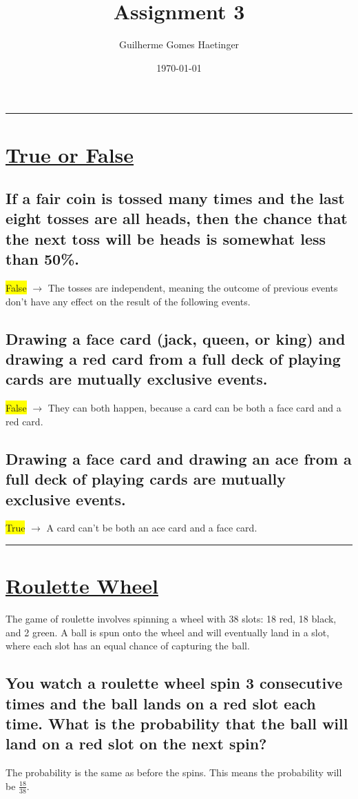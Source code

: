 \documentclass[11pt]{article}
\author{Guilherme Gomes Haetinger}
\date{\today}
\title{\huge Assignment 3}
\begin{document}
\maketitle
\thispagestyle{empty}

\noindent\rule{\textwidth}{0.5pt}

\section{\underline{True or False}}
\label{sec:orgd26d85e}

\subsection{If a fair coin is tossed many times and the last eight tosses are all heads, then the chance that the next toss will be heads is somewhat less than 50\%.}
\label{sec:org118ecb7}
\colorbox{yellow}{False} \(\to\) The tosses are independent, meaning the outcome of previous events don't have any effect on the result of the following events.
\subsection{Drawing a face card (jack, queen, or king) and drawing a red card from a full deck of playing cards are mutually exclusive events.}
\label{sec:orgc3ce876}
\colorbox{yellow}{False} \(\to\) They can both happen, because a card can be both a face card and a red card.
\subsection{Drawing a face card and drawing an ace from a full deck of playing cards are mutually exclusive events.}
\label{sec:orgbc3fa68}
\colorbox{yellow}{True} \(\to\) A card can't be both an ace card and a face card.

\noindent\rule{\textwidth}{0.5pt}

\section{\underline{Roulette Wheel}}
\label{sec:orgd464ee6}
The game of roulette involves spinning a wheel with 38 slots: 18 red, 18 black, and 2 green. A ball is spun onto the wheel and will eventually land in a slot, where each slot has an equal chance of capturing the ball.
\subsection{You watch a roulette wheel spin 3 consecutive times and the ball lands on a red slot each time. What is the probability that the ball will land on a red slot on the next spin?}
\label{sec:orgbddc2e4}
The probability is the same as before the spins. This means the probability will be \(\frac{18}{38}\).
\end{document}

